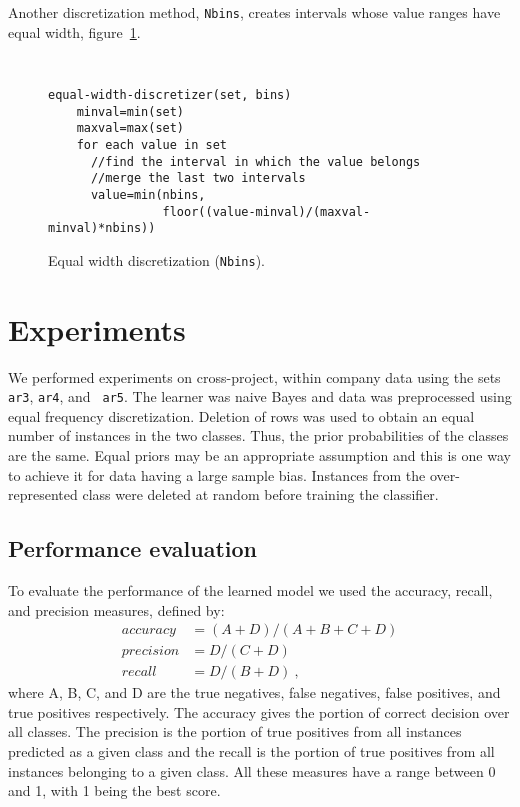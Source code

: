 \documentclass{sig-alternate}
\begin{document}
Another discretization method, {\tt Nbins}, creates intervals whose value ranges have equal width,
figure~\ref{fig:nbins}.

\begin{figure}[tbp]
\makebox[\linewidth]{\hrulefill}
{\tt\small
\begin{verbatim}
equal-width-discretizer(set, bins)
    minval=min(set)
    maxval=max(set)
    for each value in set
      //find the interval in which the value belongs
      //merge the last two intervals
      value=min(nbins,
                floor((value-minval)/(maxval-minval)*nbins))
\end{verbatim}}
\makebox[\linewidth]{\hrulefill}
\caption{Equal width discretization ({\tt Nbins}).}
\label{fig:nbins}
\end{figure}

\section{Experiments}
We performed experiments on cross-project, within company data using the sets {\tt ar3}, {\tt ar4}, and {\tt
ar5}. The learner was naive Bayes and data was preprocessed using equal frequency discretization. Deletion of
rows was used to obtain an equal number of instances in the two classes. Thus, the prior probabilities of the
classes are the same. Equal priors may be an appropriate assumption and this is one way to achieve it for data
having a large sample bias. Instances from the over-represented class were deleted at random before training
the classifier.

\subsection{Performance evaluation}
To evaluate the performance of the learned model we used the accuracy, recall, and precision measures, defined
by:
\begin{align}
accuracy &= (A+D)/(A+B+C+D) \nonumber \\
precision &= D/(C+D)\\
recall &= D/(B+D)~, \nonumber
\end{align}
where A, B, C, and D are the true negatives, false negatives, false positives, and true positives respectively. The
accuracy gives the portion of correct decision over all classes. The precision is the portion of true positives from
all instances predicted as a given class and the recall is the portion of true positives from all instances belonging
to a given class. All these measures have a range between 0 and 1, with 1 being the best score.
\end{document}
